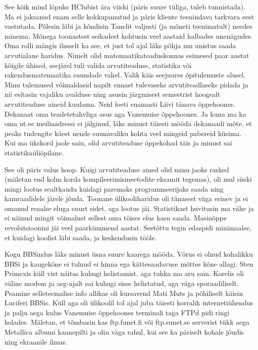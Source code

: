 See kõik mind lõpuks HClubist ära viiski (päris suure tüliga, tuleb tunnistada). Ma 
ei jaksanud enam selle kokkupunutud ja päris kliente teenindava tarkvara 
eest vastutada. Põlesin läbi ja kõndisin Tanelit valjusti (ja mõneti teenimatult) needes minema. 
Mõnega toonastest seikadest kohtusin veel aastaid halbades unenägudes. Oma rolli mängis 
ilmselt ka see, et just tol ajal läks põhja mu 
unistus saada arvutialane haridus. Nimelt olid matemaatikateaduskonnas 
esimesed paar aastat kõigile ühised, seejärel tuli valida arvutiteaduse, 
statistika või rakendusmatemaatika suundade vahel. Valik käis seejuures õpitulemuste 
alusel. Minu tulemused võimaldasid napilt ennast tulevaseks arvutiteadlaseks pidada ja 
nii esitasin vajaliku avalduse ning asusin järgmisest semestrist hoogsalt 
arvutiteaduse aineid kuulama. Neid loeti enamasti Liivi tänava 
õppehoones. 
Dekanaat oma teadetetahvliga asus aga Vanemuise õppehoones. Ja kuna ma ka oma 
ut.ee meiliaadressi ei jälginud, läks minust täiesti mööda dekanaadi mõte, et 
peaks tudengite käest nende suunavaliku kohta veel mingeid pabereid küsima. 
Kui ma ükskord jaole sain, olid 
arvutiteaduse õppekohad täis ja minust sai statistikaüliõpilane. 

See oli päris 
valus hoop. Kuigi arvutiteaduse ained olid minu jaoks rasked (mäletan end kolm 
korda kompileerimismeetodite eksamit tegemas), oli mul siiski mingi lootus 
sealtkaudu kuidagi paremaks programmeerijaks saada ning kamraadidele järele 
jõuda. Toonane ülikooliharidus oli tänasest väga erinev ja ei omanud reaalse eluga 
suurt sidet, aga lootus jäi. Statistikast huvitusin ma vähe ja 
ei näinud mingit võimalust sellest oma töises elus kasu saada. Masinõppe revolutsioonini 
jäi veel paarkümmend aastat. Seetõttu tegin 
edaspidi minimaalse, et kuidagi koolist läbi saada, ja keskendusin tööle. 

Kogu BBSindus läks minust üsna suure kaarega mööda. Võrus ei olnud kohalikku 
BBSi ja kaugekõne ei tulnud ei hinna ega kättesaadavuse mõttes kõne allagi. 
Sten Primexis küll vist näitas kuhugi 
helistamist, aga tuhka ma aru sain. Korelis oli väline modem ja aeg-ajalt 
sai kuhugi sisse helistatud, aga väga sporaadiliselt. Peamine 
selleteemalise info allikas oli kursavend Mati Muts ja 
põhiliselt käisin Luciferi BBSis. Küll aga oli 
ülikoolil tol ajal juba täiesti korralik internetiühendus ja palju aega kulus 
Vanemuise õppehoones terminali 
taga FTPd pidi ringi kolades. Mäletan, et tõmbasin kas ftp.funet.fi või 
ftp.sunet.se serverist tükk aega Metallica albumi kaanepilti ja olin väga 
rahul, kui see ka päriselt kohale jõudis ning ekraanile ilmus.

